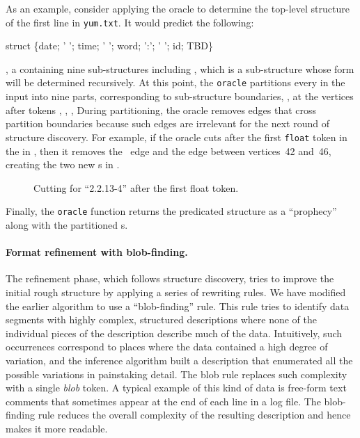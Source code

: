 As an example, consider applying the oracle to determine the top-level
structure of the first line in \texttt{yum.txt}.  It would predict the
following: 
\begin{centercode}
struct \{date;  ' '; time; ' '; word; ':'; ' '; id; TBD\}
\end{centercode}
\ie{}, a  containing nine sub-structures including , which is
a sub-structure whose form will be determined recursively.
At this point, the {\tt oracle} partitions
every \seqset{} in the input into nine parts, corresponding to
sub-structure boundaries,
\ie{}, at the vertices after tokens , , ,
\etc{}
During partitioning, the oracle removes \seqset{} edges that cross partition
boundaries because such edges are irrelevant for the next round
of structure discovery.
For example, if the oracle cuts after the first {\tt float} token in the \seqset{}
in , then it removes the ~edge and the  edge between
vertices~42 and~46, creating the two new \seqset{}s in .
%
\begin{figure}[th]
\begin{center}
\end{center}
\caption{Cutting \seqset{} for ``2.2.13-4'' after the first float token.} \label{fig:cut}
\shrink
\end{figure}
%
Finally, the {\tt oracle} function returns the predicated structure as a ``prophecy''
along with the partitioned \seqset{}s. 

\paragraph*{Format refinement with blob-finding.}
The refinement phase, which follows structure discovery, tries to
improve the initial rough structure by applying a series of
rewriting rules.  We have modified the earlier algorithm to use a 
``blob-finding'' rule.  This rule tries to identify data segments 
with highly complex, structured descriptions where none of the 
individual pieces of the description describe much of the data.
Intuitively, such occurrences correspond to places where the data
contained a high degree of variation, and the inference algorithm
built a description that enumerated all the possible variations in
painstaking detail. 
The blob rule replaces such complexity with a single \textit{blob} token.
A typical example of this kind
of data is free-form text comments that sometimes appear at the end of
each line in a log file.  The blob-finding rule reduces the overall
complexity of the resulting description and hence makes it more
readable.

